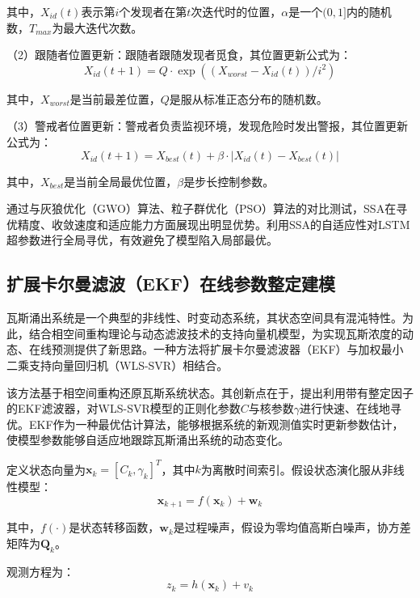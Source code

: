 \documentclass[twocolumn,a4paper]{ctexart}
\numberwithin{equation}{section}
\begin{document}
其中，$X_{id}(t)$表示第$i$个发现者在第$t$次迭代时的位置，$\alpha$是一个$(0,1]$内的随机数，$T_{max}$为最大迭代次数。

（2）跟随者位置更新：跟随者跟随发现者觅食，其位置更新公式为：
\begin{equation}
X_{id}(t+1) = Q \cdot \exp((X_{worst}-X_{id}(t))/i^2)
\end{equation}

其中，$X_{worst}$是当前最差位置，$Q$是服从标准正态分布的随机数。

（3）警戒者位置更新：警戒者负责监视环境，发现危险时发出警报，其位置更新公式为：
\begin{equation}
X_{id}(t+1) = X_{best}(t) + \beta \cdot |X_{id}(t)-X_{best}(t)|
\end{equation}

其中，$X_{best}$是当前全局最优位置，$\beta$是步长控制参数。

通过与灰狼优化（GWO）算法、粒子群优化（PSO）算法的对比测试，SSA在寻优精度、收敛速度和适应能力方面展现出明显优势。利用SSA的自适应性对LSTM超参数进行全局寻优，有效避免了模型陷入局部最优。

\subsection{扩展卡尔曼滤波（EKF）在线参数整定建模}

瓦斯涌出系统是一个典型的非线性、时变动态系统，其状态空间具有混沌特性。为此，结合相空间重构理论与动态滤波技术的支持向量机模型，为实现瓦斯浓度的动态、在线预测提供了新思路。一种方法将扩展卡尔曼滤波器（EKF）与加权最小二乘支持向量回归机（WLS-SVR）相结合。

该方法基于相空间重构还原瓦斯系统状态。其创新点在于，提出利用带有整定因子的EKF滤波器，对WLS-SVR模型的正则化参数$C$与核参数$\gamma$进行快速、在线地寻优。EKF作为一种最优估计算法，能够根据系统的新观测值实时更新参数估计，使模型参数能够自适应地跟踪瓦斯涌出系统的动态变化。

定义状态向量为$\bm{x}_k=[C_k,\gamma_k]^T$，其中$k$为离散时间索引。假设状态演化服从非线性模型：
\begin{equation}
\bm{x}_{k+1} = f(\bm{x}_k) + \bm{w}_k
\end{equation}

其中，$f(\cdot)$是状态转移函数，$\bm{w}_k$是过程噪声，假设为零均值高斯白噪声，协方差矩阵为$\bm{Q}_k$。

观测方程为：
\begin{equation}
z_k = h(\bm{x}_k) + v_k
\end{equation}
\end{document}
